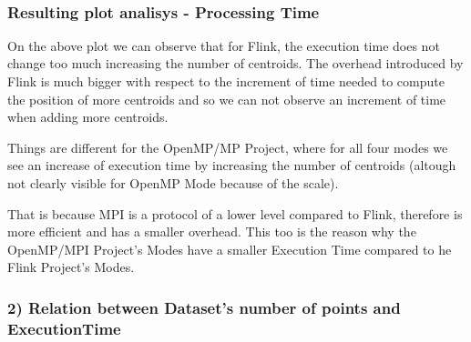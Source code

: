 \documentclass[11pt]{article}
\begin{document}
    \begin{center}
    \end{center}
    { \hspace*{\fill} \\}
    
    \hypertarget{resulting-plot-analisys---processing-time}{%
\subsubsection{Resulting plot analisys - Processing
Time}\label{resulting-plot-analisys---processing-time}}

On the above plot we can observe that for Flink, the execution time does
not change too much increasing the number of centroids. The overhead
introduced by Flink is much bigger with respect to the increment of time
needed to compute the position of more centroids and so we can not
observe an increment of time when adding more centroids.

Things are different for the OpenMP/MP Project, where for all four modes
we see an increase of execution time by increasing the number of
centroids (altough not clearly visible for OpenMP Mode because of the
scale).

That is because MPI is a protocol of a lower level compared to Flink,
therefore is more efficient and has a smaller overhead. This too is the
reason why the OpenMP/MPI Project's Modes have a smaller Execution Time
compared to he Flink Project's Modes.

    \hypertarget{relation-between-datasets-number-of-points-and-executiontime}{%
\subsubsection{2) Relation between Dataset's number of points and
ExecutionTime}\label{relation-between-datasets-number-of-points-and-executiontime}}
\end{document}
